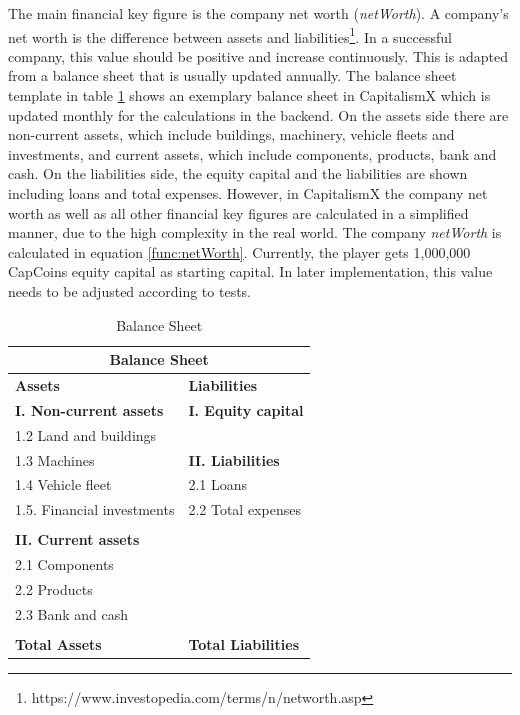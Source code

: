 The main financial key figure is the company net worth (\textit{netWorth}). A company's net worth is the difference between assets and liabilities\footnote{https://www.investopedia.com/terms/n/networth.asp}. In a successful company, this value should be positive and increase continuously. This is adapted from a balance sheet that is usually updated annually. The balance sheet template in table \ref{tab:balanceSheet} shows an exemplary balance sheet in CapitalismX which is updated monthly for the calculations in the backend. On the assets side there are non-current assets, which include buildings, machinery, vehicle fleets and investments, and current assets, which include components, products, bank and cash. On the liabilities side, the equity capital and the liabilities are shown including loans and total expenses. However, in CapitalismX the company net worth as well as all other financial key figures are calculated in a simplified manner, due to the high complexity in the real world. The company \textit{netWorth} is calculated in equation \ref{func:netWorth}. Currently, the player gets 1,000,000 CapCoins equity capital as starting capital. In later implementation, this value needs to be adjusted according to tests.

\begin{table}[ht]
\begin{tabular}{|p{5.8cm}|p{5.8cm}|}
\hline
\multicolumn{2}{|c|}{\textbf{Balance Sheet}}\\
\hline \textbf{Assets} & \textbf{Liabilities}\\ 
\hline \textbf{I. Non-current assets} & \textbf{I. Equity capital}\\
\hline 1.2 Land and buildings &\\
\hline 1.3 Machines & \textbf{II. Liabilities}\\
\hline 1.4 Vehicle fleet & 2.1 Loans\\
\hline 1.5. Financial investments &  2.2 Total expenses\\
\hline &\\
\hline \textbf{II. Current assets} &\\
\hline 2.1 Components &\\
\hline 2.2 Products &\\
\hline 2.3 Bank and cash &\\
\hline &\\
\hline \textbf{Total Assets} & \textbf{Total Liabilities}\\
\hline
\end{tabular}
\caption{Balance Sheet}
\label{tab:balanceSheet}
\end{table}

